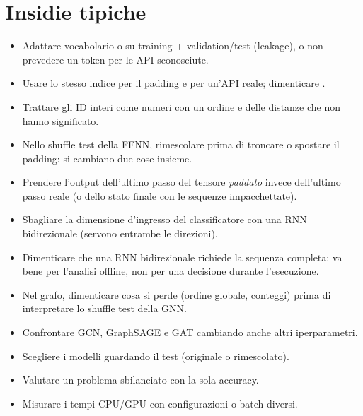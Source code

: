 \section{Insidie tipiche}
\begin{attenzione}
\begin{itemize}
  \item Adattare vocabolario o  su training + validation/test (leakage), o non
        prevedere un token per le API sconosciute.
  \item Usare lo stesso indice per il padding e per un'API reale; dimenticare .
  \item Trattare gli ID interi come numeri con un ordine e delle distanze che non hanno significato.
  \item Nello shuffle test della FFNN, rimescolare prima di troncare o spostare il padding: si
        cambiano due cose insieme.
  \item Prendere l'output dell'ultimo passo del tensore \emph{paddato} invece dell'ultimo passo reale
        (o dello stato finale con le sequenze impacchettate).
  \item Sbagliare la dimensione d'ingresso del classificatore con una RNN bidirezionale (servono
        entrambe le direzioni).
  \item Dimenticare che una RNN bidirezionale richiede la sequenza completa: va bene per l'analisi
        offline, non per una decisione durante l'esecuzione.
  \item Nel grafo, dimenticare cosa si perde (ordine globale, conteggi) prima di interpretare lo
        shuffle test della GNN.
  \item Confrontare GCN, GraphSAGE e GAT cambiando anche altri iperparametri.
  \item Scegliere i modelli guardando il test (originale o rimescolato).
  \item Valutare un problema sbilanciato con la sola accuracy.
  \item Misurare i tempi CPU/GPU con configurazioni o batch diversi.
\end{itemize}
\end{attenzione}

